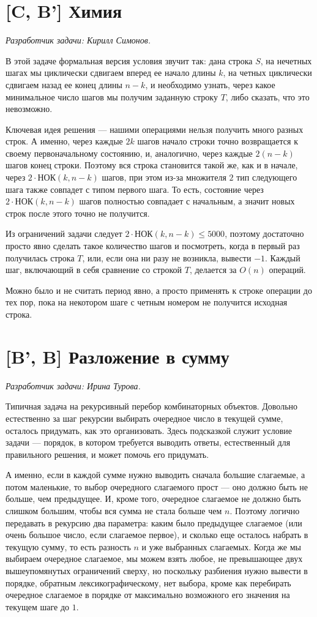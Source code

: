 \documentclass[12pt]{article}
\theoremstyle{definition}
\begin{document}
\section{[C, B'] Химия}
\textit{Разработчик задачи: Кирилл Симонов.}

В этой задаче формальная версия условия звучит так: дана строка $S$, на нечетных шагах
мы циклически сдвигаем вперед ее начало длины $k$, на четных циклически сдвигаем назад
ее конец длины $n - k$, и необходимо узнать, через какое минимальное число шагов мы получим заданную строку $T$, либо сказать, что это невозможно.

Ключевая идея решения --- нашими операциями нельзя получить много разных строк.
А именно, через каждые $2k$ шагов начало строки точно возвращается к
своему первоначальному состоянию, и, аналогично,
через каждые $2(n - k)$ шагов конец строки. Поэтому вся строка становится такой же, как и в начале, через $2\cdot \text{НОК}(k, n - k)$ шагов, при этом из-за множителя $2$
тип следующего шага также совпадет с типом первого шага.
То есть, состояние через $2\cdot \text{НОК}(k, n - k)$ шагов полностью совпадает с начальным,
а значит новых строк после этого точно не получится.

Из ограничений задачи следует $2\cdot \text{НОК}(k, n - k) \le 5000$, поэтому
достаточно просто явно сделать такое количество шагов и посмотреть, когда в первый раз получилась строка $T$, или, если она ни разу не возникла, вывести $-1$. Каждый шаг, включающий в себя сравнение со строкой $T$, делается за $O(n)$ операций.

Можно было и не считать период явно, а просто применять к строке операции до тех пор,
пока на некотором шаге с четным номером не получится исходная строка.

\section{[B', B] Разложение в сумму}
\textit{Разработчик задачи: Ирина Турова.}

Типичная задача на рекурсивный перебор комбинаторных объектов. Довольно естественно за шаг рекурсии выбирать очередное число
в текущей сумме, осталось придумать, как это организовать. Здесь подсказкой служит условие задачи --- порядок, в котором
требуется выводить ответы, естественный для правильного решения, и может помочь его придумать.

А именно, если в каждой сумме нужно выводить
сначала большие слагаемые, а потом маленькие, то
выбор очередного слагаемого прост --- оно должно быть не больше, чем предыдущее.
И, кроме того, очередное слагаемое не должно быть слишком
большим, чтобы вся сумма не стала больше чем $n$. Поэтому
логично передавать в рекурсию два параметра: каким было предыдущее слагаемое (или очень большое число, если слагаемое первое), и сколько еще осталось набрать в текущую сумму, то есть 
разность $n$ и уже выбранных слагаемых.
Когда же мы выбираем очередное слагаемое, мы можем взять любое,
не превышающее двух вышеупомянутых ограничений сверху, но
поскольку разбиения нужно вывести в порядке, обратным лексикографическому, нет выбора, кроме как перебирать очередное слагаемое в порядке от максимально возможного его значения
на текущем шаге до $1$.
\end{document}
